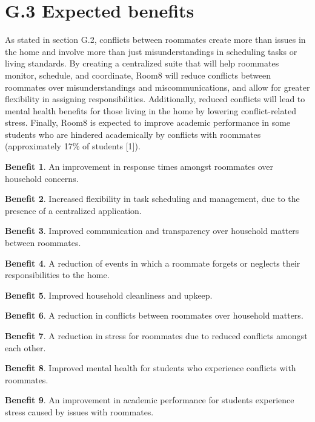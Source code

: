 \documentclass{scrreprt}
\newcommand*{\nsection}[1]{
    \section*{#1}
    \addcontentsline{toc}{section}{#1}
}
\theoremstyle{definition}
\newtheorem{benefit}{Benefit}
\begin{document}
\nsection{G.3 Expected benefits}
\begin{flushleft}
As stated in section G.2, conflicts between roommates create more than issues in the home and involve more than just misunderstandings in scheduling tasks or living standards. By creating a centralized suite that will help roommates monitor, schedule, and coordinate, Room8 will reduce conflicts between roommates over misunderstandings and miscommunications, and allow for greater flexibility in assigning responsibilities. Additionally, reduced conflicts will lead to mental health benefits for those living in the home by lowering conflict-related stress.  Finally, Room8 is expected to improve academic performance in some students who are hindered academically by conflicts with roommates (approximately 17\% of students [1]). 

\begin{benefit}\label{benefit:first}
An improvement in response times amongst roommates over household concerns.
\end{benefit}

\begin{benefit}\label{benefit:first}
Increased flexibility in task scheduling and management, due to the presence of a centralized application.
\end{benefit}

\begin{benefit}\label{benefit:first}
Improved communication and transparency over household matters between roommates.
\end{benefit}

\begin{benefit}\label{benefit:first}
A reduction of events in which a roommate forgets or neglects their responsibilities to the home.
\end{benefit}

\begin{benefit}\label{benefit:first}
Improved household cleanliness and upkeep.
\end{benefit}

\begin{benefit}\label{benefit:first}
A reduction in conflicts between roommates over household matters.
\end{benefit}

\begin{benefit}\label{benefit:first}
A reduction in stress for roommates due to reduced conflicts amongst each other.\end{benefit}

\begin{benefit}\label{benefit:first}
Improved mental health for students who experience conflicts with roommates.
\end{benefit}

\begin{benefit}\label{benefit:first}
An improvement in academic performance for students experience stress caused by issues with roommates.
\end{benefit}

\end{flushleft}
\end{document}
